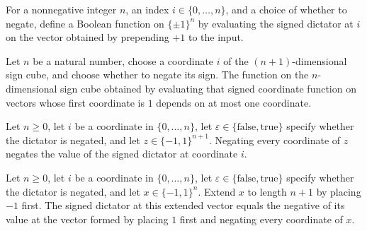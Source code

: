 \begin{definition}
\label{FABL.balancedFKNProjection}
\leanok
{}
For a nonnegative integer $n$, an index $i\in\{0,\ldots,n\}$, and a choice of whether to
negate, define a Boolean function on $\{\pm1\}^n$ by evaluating the signed dictator at
$i$ on the vector obtained by prepending $+1$ to the input.
\end{definition}

\begin{theorem}
\label{FABL.balancedFKNProjection_isKJunta_one}
\leanok
{}
Let $n$ be a natural number, choose a coordinate $i$ of the $(n+1)$-dimensional sign
cube, and choose whether to negate its sign. The function on the $n$-dimensional sign
cube obtained by evaluating that signed coordinate function on vectors whose first
coordinate is $1$ depends on at most one coordinate.
\end{theorem}

\begin{theorem}
\label{FABL.signedDictator_neg_input}
\leanok
{}
Let $n\ge 0$, let $i$ be a coordinate in $\{0,\ldots,n\}$, let
$\varepsilon\in\{\text{false},\text{true}\}$ specify whether the dictator is negated,
and let $z\in\{-1,1\}^{n+1}$. Negating every coordinate of $z$ negates the value of the
signed dictator at coordinate $i$.
\end{theorem}

\begin{theorem}
\label{FABL.signedDictator_fin_cons_neg_one}
\leanok
{}
Let $n\ge 0$, let $i$ be a coordinate in $\{0,\ldots,n\}$, let
$\varepsilon\in\{\text{false},\text{true}\}$ specify whether the dictator is negated,
and let $x\in\{-1,1\}^n$. Extend $x$ to length $n+1$ by placing $-1$ first. The signed
dictator at this extended vector equals the negative of its value at the vector formed
by placing $1$ first and negating every coordinate of $x$.
\end{theorem}


